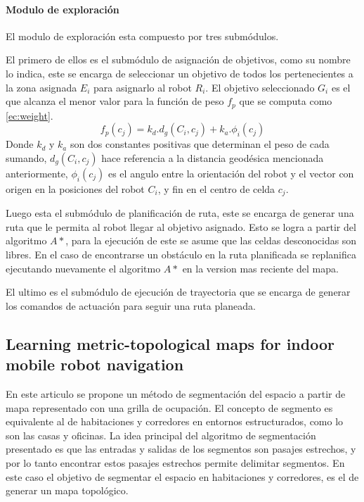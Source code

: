 \paragraph{Modulo de exploración}\label{par:estar:moduloexp}
El modulo de exploración esta compuesto por tres submódulos. 

El primero de ellos es el submódulo de asignación de objetivos, como su nombre lo indica, este se encarga de seleccionar un objetivo de todos los pertenecientes a la zona asignada $E_i$ para asignarlo al robot $R_i$. El objetivo seleccionado $G_i$ es el que alcanza el menor valor para la función de peso $f_p$ que se computa como \ref{ec:weight}.
\begin{equation}\label{ec:weight}
  f_p(c_j) = k_d.d_g(C_i,c_j) + k_a.\phi_i(c_j)
\end{equation}
Donde $k_d$ y $k_a$ son dos constantes positivas que determinan el peso de cada sumando, $d_g(C_i,c_j)$ hace referencia a la distancia geodésica mencionada anteriormente, $\phi_i(c_j)$ es el angulo entre la orientación del robot y el vector con origen en la posiciones del robot $C_i$, y fin en el centro de celda $c_j$. 

Luego esta el submódulo de planificación de ruta, este se encarga de generar una ruta que le permita al robot llegar al objetivo asignado. Esto se logra a partir del algoritmo $A*$, para la ejecución de este se asume que las celdas desconocidas son libres. En el caso de encontrarse un obstáculo en la ruta planificada se replanifica ejecutando nuevamente el algoritmo $A*$ en la version mas reciente del mapa.

El ultimo es el submódulo de ejecución de trayectoria que se encarga de generar los comandos de actuación para seguir una ruta planeada.

\subsection{Learning metric-topological maps for indoor mobile robot navigation}
En este articulo se propone un método de segmentación del espacio a partir de mapa representado con una grilla de ocupación. El concepto de segmento es equivalente al de habitaciones y corredores en entornos estructurados, como lo son las casas y oficinas. La idea principal del algoritmo de segmentación presentado es que las entradas y salidas de los segmentos son pasajes estrechos, y por lo tanto encontrar estos pasajes estrechos permite delimitar segmentos. En este caso el objetivo de segmentar el espacio en habitaciones y corredores, es el de generar un mapa topológico.

